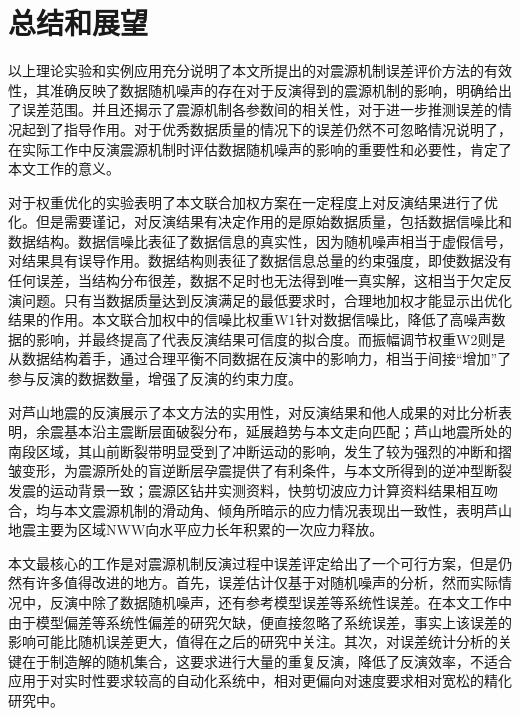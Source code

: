 

\chapter{总结和展望}
以上理论实验和实例应用充分说明了本文所提出的对震源机制误差评价方法的有效性，其准确反映了数据随机噪声的存在对于反演得到的震源机制的影响，明确给出了误差范围。并且还揭示了震源机制各参数间的相关性，对于进一步推测误差的情况起到了指导作用。对于优秀数据质量的情况下的误差仍然不可忽略情况说明了，在实际工作中反演震源机制时评估数据随机噪声的影响的重要性和必要性，肯定了本文工作的意义。

对于权重优化的实验表明了本文联合加权方案在一定程度上对反演结果进行了优化。但是需要谨记，对反演结果有决定作用的是原始数据质量，包括数据信噪比和数据结构。数据信噪比表征了数据信息的真实性，因为随机噪声相当于虚假信号，对结果具有误导作用。数据结构则表征了数据信息总量的约束强度，即使数据没有任何误差，当结构分布很差，数据不足时也无法得到唯一真实解，这相当于欠定反演问题。只有当数据质量达到反演满足的最低要求时，合理地加权才能显示出优化结果的作用。本文联合加权中的信噪比权重W1针对数据信噪比，降低了高噪声数据的影响，并最终提高了代表反演结果可信度的拟合度。而振幅调节权重W2则是从数据结构着手，通过合理平衡不同数据在反演中的影响力，相当于间接“增加”了参与反演的数据数量，增强了反演的约束力度。

对芦山地震的反演展示了本文方法的实用性，对反演结果和他人成果的对比分析表明，余震基本沿主震断层面破裂分布，延展趋势与本文走向匹配；芦山地震所处的南段区域，其山前断裂带明显受到了冲断运动的影响，发生了较为强烈的冲断和摺皱变形，为震源所处的盲逆断层孕震提供了有利条件，与本文所得到的逆冲型断裂发震的运动背景一致；震源区钻井实测资料，快剪切波应力计算资料结果相互吻合，均与本文震源机制的滑动角、倾角所暗示的应力情况表现出一致性，表明芦山地震主要为区域NWW向水平应力长年积累的一次应力释放。

本文最核心的工作是对震源机制反演过程中误差评定给出了一个可行方案，但是仍然有许多值得改进的地方。首先，误差估计仅基于对随机噪声的分析，然而实际情况中，反演中除了数据随机噪声，还有参考模型误差等系统性误差。在本文工作中由于模型偏差等系统性偏差的研究欠缺，便直接忽略了系统误差，事实上该误差的影响可能比随机误差更大，值得在之后的研究中关注。其次，对误差统计分析的关键在于制造解的随机集合，这要求进行大量的重复反演，降低了反演效率，不适合应用于对实时性要求较高的自动化系统中，相对更偏向对速度要求相对宽松的精化研究中。
